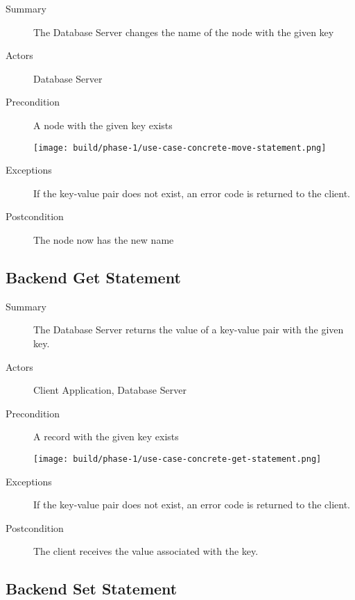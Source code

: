 \documentclass[a4paper]{report}
\begin{document}
	\begin{description}
		\item[Summary] The Database Server changes the name of the node with the given key
		\item[Actors] Database Server
		\item[Precondition] A node with the given key exists

		\begin{center}
			\texttt{[image: build/phase-1/use-case-concrete-move-statement.png]}
		\end{center}

		\item[Exceptions] If the key-value pair does not exist, an error code is returned to the client.
		\item[Postcondition] The node now has the new name
	\end{description}

	\pagebreak
	
	\subsection{Backend Get Statement}

	\begin{description}
		\item[Summary] The Database Server returns the value of a key-value pair with the given key.
		\item[Actors] Client Application, Database Server
		\item[Precondition] A record with the given key exists

		\begin{center}
			\texttt{[image: build/phase-1/use-case-concrete-get-statement.png]}
		\end{center}

		\item[Exceptions] If the key-value pair does not exist, an error code is returned to the client.
		\item[Postcondition] The client receives the value associated with the key.
	\end{description}

	\pagebreak
	
	\subsection{Backend Set Statement}
\end{document}
